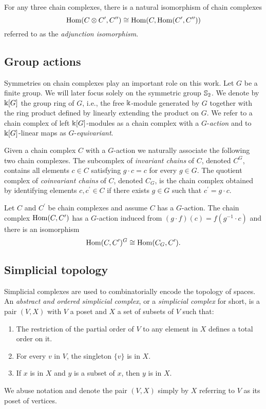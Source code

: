 For any three chain complexes, there is a natural isomorphism of chain complexes
\begin{equation} \label{e:adjunction isomorphism}
\mathrm{Hom}(C \otimes C^\prime, C^{\prime\prime}) \cong
\mathrm{Hom}(C, \mathrm{Hom}(C^\prime, C^{\prime\prime}))
\end{equation}
referred to as the \textit{adjunction isomorphism}.

\subsection{Group actions}

Symmetries on chain complexes play an important role on this work.
Let $G$ be a finite group.
We will later focus solely on the symmetric group $\mathbb{S}_2$.
We denote by $\Bbbk[G]$ the group ring of $G$, i.e., the free $\Bbbk$-module generated by $G$ together with the ring product defined by linearly extending the product on $G$.
We refer to a chain complex of left $\Bbbk[G]$-modules as a chain complex with a $G$-\textit{action} and to $\Bbbk[G]$-linear maps as $G$-\textit{equivariant}.

Given a chain complex $C$ with a $G$-action we naturally associate the following two chain complexes.
The subcomplex of \textit{invariant chains} of $C$, denoted $C^G$, contains all elements $c \in C$ satisfying $g \cdot c = c$ for every $g \in G$.
The quotient complex of \textit{coinvariant chains} of $C$, denoted $C_G$, is the chain complex obtained by identifying elements $c, c^\prime \in C$ if there exists $g \in G$ such that $c^\prime = g \cdot c$.

Let $C$ and $C^\prime$ be chain complexes and assume $C$ has a $G$-action.
The chain complex $\mathrm{Hom}(C, C^\prime)$ has a $G$-action induced from $(g \cdot f)(c) = f(g^{-1} \cdot c)$ and there is an isomorphism
\begin{equation} \label{e:invariant hom iso hom coinvariants}
\mathrm{Hom}(C, C^\prime)^G \cong \mathrm{Hom}(C_G, C^\prime).
\end{equation}

\subsection{Simplicial topology}

Simplicial complexes are used to combinatorially encode the topology of spaces.
An \textit{abstract and ordered simplicial complex}, or a \textit{simplicial complex} for short, is a pair $(V, X)$ with $V$ a poset and $X$ a set of subsets of $V$ such that:
\begin{enumerate}
	\item The restriction of the partial order of $V$ to any element in $X$ defines a total order on it.
	\item For every $v$ in $V$, the singleton $\{v\}$ is in $X$.
	\item If $x$ is in $X$ and $y$ is a subset of $x$, then $y$ is in $X$.
\end{enumerate}
We abuse notation and denote the pair $(V, X)$ simply by $X$ referring to $V$ as its poset of vertices.

